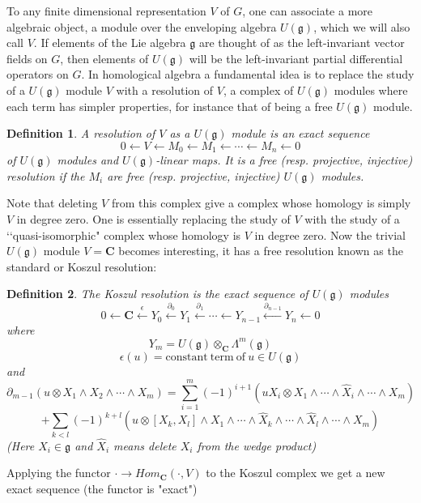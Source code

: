 \documentclass[a4paper,a4paper]{article}
\newtheorem{define}{Definition}
\theoremstyle{conjecture}
\begin{document}
To any finite dimensional representation $V$ of $G$, one can associate a more algebraic
object, a module over the enveloping algebra $U(\mathfrak g)$, which we will also call $V$.
If elements of the Lie algebra $\mathfrak g$ are thought of as the left-invariant vector
fields on $G$, then elements of $U(\mathfrak g)$ will be the left-invariant partial
differential operators on $G$.  In homological algebra a fundamental idea is to
replace the study of a $U(\mathfrak g)$ module $V$ with a resolution of $V$, a complex
of $U(\mathfrak g)$ modules where each term has simpler properties, for instance that
of being a free $U(\mathfrak g)$ module.

\begin{define}
A resolution of $V$ as a $U(\mathfrak g)$ module is an exact
sequence
$$0\leftarrow V \leftarrow M_0\leftarrow M_1 \leftarrow \cdots \leftarrow M_n\leftarrow 0$$
of $U(\mathfrak g)$ modules and $U(\mathfrak g)$-linear maps.  It is
a free (resp. projective, injective) resolution if the $M_i$ are free (resp. projective,
injective) $U(\mathfrak g)$ modules.
\end{define}

Note that deleting $V$ from this complex give a complex whose homology is simply
$V$ in degree zero.  One is essentially replacing the study of $V$ with the study
of a \lq\lq quasi-isomorphic" complex whose homology is $V$ in degree zero.  Now the trivial $U(\mathfrak g)$
module $V=\mathbf C$
becomes interesting, it has a free resolution known as the standard or Koszul
resolution:
\begin{define}
The Koszul resolution is the exact sequence of $U(\mathfrak g)$ modules
$$0\longleftarrow\mathbf C\stackrel{\epsilon}\longleftarrow Y_0\stackrel{\partial_0}\longleftarrow Y_1
\stackrel{\partial_1}\longleftarrow\cdots\longleftarrow Y_{n-1}\stackrel{\partial_{n-1}}\longleftarrow Y_n
\longleftarrow 0$$
where
$$Y_m=U(\mathfrak g)\otimes_{\mathbf C}\Lambda^m(\mathfrak g)$$
$$\epsilon(u)= {\mathrm {constant\ term\ of\ }}u\in U(\mathfrak g)$$
and
$$\partial_{m-1}(u\otimes X_1\wedge X_2\wedge\cdots\wedge X_m)=\sum_{i=1}^{m}
(-1)^{i+1}(uX_i\otimes X_1\wedge\cdots\wedge\hat X_i\wedge\cdots\wedge X_m)$$
$$+\sum_{k<l}(-1)^{k+l}(u\otimes[X_k,X_l]\wedge X_1\wedge\cdots
\wedge \hat X_k\wedge\cdots \wedge \hat X_l\wedge\cdots \wedge X_m)$$
(Here $X_i\in \mathfrak g$ and $\hat X_i$ means delete $X_i$ from the wedge product)

\end{define}

Applying the functor $\cdot\rightarrow Hom_{\mathbf C}(\cdot, V)$ to
the Koszul complex we get a new exact sequence (the functor is "exact")
\end{document}
